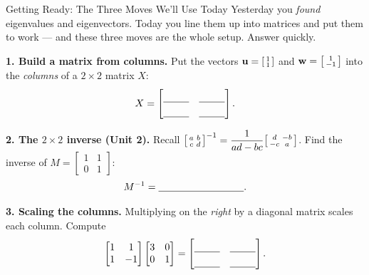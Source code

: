 \documentclass[10pt]{article}
\begin{document}
\namedateperiod

\vspace{0.12in}

\begin{notesbox}{Getting Ready: The Three Moves We'll Use Today}
\small Yesterday you \emph{found} eigenvalues and eigenvectors. Today you line them up into matrices and
put them to work --- and these three moves are the whole setup. Answer quickly.

\vspace{4pt}
\textbf{1. Build a matrix from columns.} Put the vectors $\mathbf{u}=\begin{bsmallmatrix}1\\1\end{bsmallmatrix}$
and $\mathbf{w}=\begin{bsmallmatrix}1\\-1\end{bsmallmatrix}$ into the \emph{columns} of a $2\times2$ matrix $X$:
\[
  X=\begin{bmatrix}\rule{0pt}{1.2em}\blank{0.9cm} & \blank{0.9cm}\\[3pt]\blank{0.9cm} & \blank{0.9cm}\end{bmatrix}.
\]

\vspace{4pt}
\textbf{2. The $2\times2$ inverse (Unit 2).} Recall
$\begin{bsmallmatrix} a & b \\ c & d \end{bsmallmatrix}^{-1}=\dfrac{1}{ad-bc}\begin{bsmallmatrix} d & -b \\ -c & a \end{bsmallmatrix}$.
Find the inverse of $M=\begin{bmatrix} 1 & 1 \\ 0 & 1 \end{bmatrix}$:
\[
  M^{-1}=\blank{3.0cm}.
\]

\vspace{4pt}
\textbf{3. Scaling the columns.} Multiplying on the \emph{right} by a diagonal matrix scales each column.
Compute
\[
  \begin{bmatrix} 1 & 1 \\ 1 & -1 \end{bmatrix}\begin{bmatrix} 3 & 0 \\ 0 & 1 \end{bmatrix}
  =\begin{bmatrix}\rule{0pt}{1.2em}\blank{0.9cm} & \blank{0.9cm}\\[3pt]\blank{0.9cm} & \blank{0.9cm}\end{bmatrix}.
\]
\end{notesbox}
\end{document}

